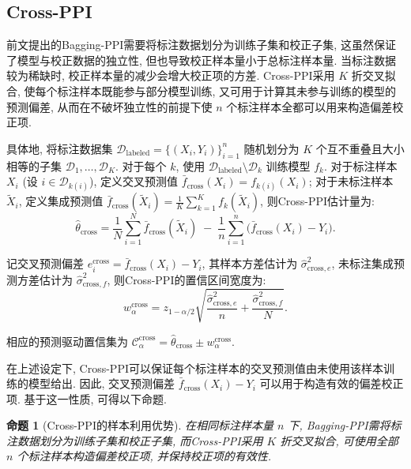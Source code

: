 \documentclass[a4paper, AutoFakeBold, UTF8]{ctexrep}
\theoremstyle{plain}
\newtheorem{prop}{命题}[chapter]
\numberwithin{equation}{chapter}
\begin{document}
\subsection{Cross-PPI}

前文提出的Bagging-PPI需要将标注数据划分为训练子集和校正子集, 这虽然保证了模型与校正数据的独立性, 但也导致校正样本量小于总标注样本量. 当标注数据较为稀缺时, 校正样本量的减少会增大校正项的方差. Cross-PPI采用 $K$ 折交叉拟合, 使每个标注样本既能参与部分模型训练, 又可用于计算其未参与训练的模型的预测偏差, 从而在不破坏独立性的前提下使 $n$ 个标注样本全都可以用来构造偏差校正项. 

具体地, 将标注数据集 $\mathcal{D}_{\text{labeled}} = \{ (X_i, Y_i) \}_{i=1}^n$ 随机划分为 $K$ 个互不重叠且大小相等的子集 $\mathcal{D}_1, \ldots, \mathcal{D}_K$. 对于每个 $k$, 使用 $\mathcal{D}_{\text{labeled}} \setminus \mathcal{D}_k$ 训练模型 $f_k$. 对于标注样本 $X_i$ (设 $i \in \mathcal{D}_{k (i) }$), 定义交叉预测值 $\bar{f}_{\text{cross}} (X_i)  = f_{k (i) } (X_i) $; 对于未标注样本 $\tilde{X}_i$, 定义集成预测值 $\bar{f}_{\text{cross}} (\tilde{X}_i)  = \frac{1}{K}\sum_{k=1}^K f_k (\tilde{X}_i) $, 则Cross-PPI估计量为: 
\begin{equation}
\hat{\theta}_{\text{cross}} = \frac{1}{N}\sum_{i=1}^{N} \bar{f}_{\text{cross}} (\tilde{X}_i)  \; -\;  \frac{1}{n}\sum_{i=1}^{n} \bigl (\bar{f}_{\text{cross}} (X_i)  - Y_i\bigr). \label{eq: theta_cross}
\end{equation}

记交叉预测偏差 $e_i^{\text{cross}} = \bar{f}_{\text{cross}} (X_i)  - Y_i$, 其样本方差估计为 $\hat{\sigma}_{\text{cross}, e}^{2}$, 未标注集成预测方差估计为 $\hat{\sigma}_{\text{cross}, f}^{2}$, 则Cross-PPI的置信区间宽度为: 
\begin{equation}
w_{\alpha}^{\text{cross}} = z_{1-\alpha/2} \sqrt{ \frac{\hat{\sigma}_{\text{cross}, e}^{2}}{n} + \frac{\hat{\sigma}_{\text{cross}, f}^{2}}{N} }. \label{eq: w_cross}
\end{equation}

相应的预测驱动置信集为 $\mathcal{C}_{\alpha}^{\text{cross}} = \hat{\theta}_{\text{cross}} \pm w_{\alpha}^{\text{cross}}$. 

在上述设定下, Cross-PPI可以保证每个标注样本的交叉预测值由未使用该样本训练的模型给出. 因此, 交叉预测偏差 $\bar{f}_{\text{cross}} (X_i) -Y_i$ 可以用于构造有效的偏差校正项. 基于这一性质, 可得以下命题. 
\begin{prop}[Cross-PPI的样本利用优势]
\label{prop: cross_advantage}
在相同标注样本量 $n$ 下, Bagging-PPI需将标注数据划分为训练子集和校正子集, 而Cross-PPI采用 $K$ 折交叉拟合, 可使用全部 $n$ 个标注样本构造偏差校正项, 并保持校正项的有效性. 
\end{prop}
\end{document}
